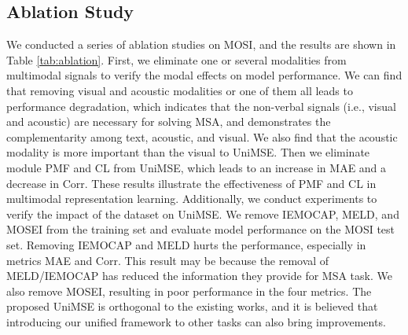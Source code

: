 \documentclass[11pt]{article}
\begin{document}
\subsection{Ablation Study}
We conducted a series of ablation studies on MOSI, and the results are shown in Table \ref{tab:ablation}. First, we eliminate one or several modalities from multimodal signals to verify the modal effects on model performance. We can find that removing visual and acoustic modalities or one of them all leads to performance degradation, which indicates that the non-verbal signals (i.e., visual and acoustic) are necessary for solving MSA, and demonstrates the complementarity among text, acoustic, and visual. We also find that the acoustic modality is more important than the visual to UniMSE. Then we eliminate module PMF and CL from UniMSE, which leads to an increase in MAE and a decrease in Corr. These results illustrate the effectiveness of PMF and CL in multimodal representation learning. 
Additionally, we conduct experiments to verify the impact of the dataset on UniMSE. We remove IEMOCAP, MELD, and MOSEI from the training set and evaluate model performance on the MOSI test set. Removing IEMOCAP and MELD hurts the performance, especially in metrics MAE and Corr. This result may be because the removal of MELD/IEMOCAP has reduced the information they provide for MSA task. We also remove MOSEI, resulting in poor performance in the four metrics. The proposed UniMSE is orthogonal to the existing works, and it is believed that introducing our unified framework to other tasks can also bring improvements.





\begin{table}[t]
\caption{Ablation study of UniMSE on MOSI. V and A represent visual and acoustic modalities, respectively. PMF and CL represent pre-trained modality fusion and contrastive learning, respectively.}
\label{tab:ablation}
\end{table}
\end{document}

